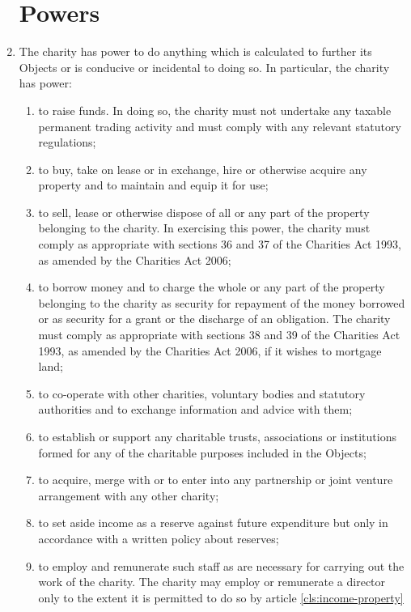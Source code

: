 \begin{enumerate}
\section{Powers}

\item
  The charity has power to do anything which is calculated to further
  its Objects or is conducive or incidental to doing so. In
  particular, the charity has power:
  \begin{enumerate}
  \item
    to raise funds. In doing so, the charity must not undertake any
    taxable permanent trading activity and must comply with any
    relevant statutory regulations;
  \item
    to buy, take on lease or in exchange, hire or otherwise acquire any
    property and to maintain and equip it for use;
  \item
    to sell, lease or otherwise dispose of all or any part of the
    property belonging to the charity. In exercising this power, the
    charity must comply as appropriate with sections 36 and 37 of the
    Charities Act 1993, as amended by the Charities Act 2006;
  \item
    to borrow money and to charge the whole or any part of the property
    belonging to the charity as security for repayment of the money
    borrowed or as security for a grant or the discharge of an
    obligation. The charity must comply as appropriate with sections 38
    and 39 of the Charities Act 1993, as amended by the Charities Act
    2006, if it wishes to mortgage land;
  \item
    to co-operate with other charities, voluntary bodies and statutory
    authorities and to exchange information and advice with them;
  \item
    to establish or support any charitable trusts, associations or
    institutions formed for any of the charitable purposes included in
    the Objects;
  \item
    to acquire, merge with or to enter into any partnership or joint
    venture arrangement with any other charity;
  \item
    to set aside income as a reserve against future expenditure but
    only in accordance with a written policy about reserves;
  \item
    to employ and remunerate such staff as are necessary for carrying
    out the work of the charity. The charity may employ or remunerate a
    director only to the extent it is permitted to do so by article \ref{cls:income-property}

\end{enumerate}
\end{enumerate}
